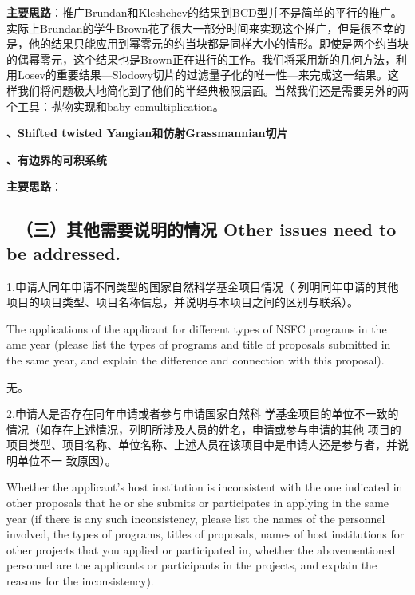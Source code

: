 \documentclass[12pt,UTF8,AutoFakeBold=4,a4paper]{ctexart}
\begin{document}
\textbf{主要思路}：推广Brundan和Kleshchev的结果到BCD型并不是简单的平行的推广。实际上Brundan的学生Brown花了很大一部分时间来实现这个推广，但是很不幸的是，他的结果只能应用到幂零元的约当块都是同样大小的情形。即使是两个约当块的偶幂零元，这个结果也是Brown正在进行的工作。我们将采用新的几何方法，利用Losev的重要结果---Slodowy切片的过滤量子化的唯一性---来完成这一结果。这样我们将问题极大地简化到了他们的半经典极限层面。当然我们还是需要另外的两个工具：抛物实现和baby comultiplication。

\textbf{、Shifted twisted Yangian和仿射Grassmannian切片}

\textbf{、有边界的可积系统}

\textbf{主要思路}：


{\color{MsBlue} \subsection{\sihao \kaishu \quad \ \bfseries（三）其他需要说明的情况 
\xiaosihao {} Other issues need to be addressed.}}
%

{\sihao \color{MsBlue} \kaishu 1.申请人同年申请不同类型的国家自然科学基金项目情况（
列明同年申请的其他项目的项目类型、项目名称信息，并说明与本项目之间的区别与联系）。}

{\color{MsBlue} \xiaosihao {} 
The applications of the applicant for different types of NSFC programs in the 
ame year (please list the types of programs and title of proposals submitted 
in the same year, and explain the difference and connection with this proposal).}

无。

{\sihao \color{MsBlue} \kaishu 2.申请人是否存在同年申请或者参与申请国家自然科
学基金项目的单位不一致的情况（如存在上述情况，列明所涉及人员的姓名，申请或参与申请的其他
项目的项目类型、项目名称、单位名称、上述人员在该项目中是申请人还是参与者，并说明单位不一
致原因）。}

{\color{MsBlue} \xiaosihao {} 
Whether the applicant's host institution is inconsistent with the one indicated 
in other proposals that he or she submits or participates in applying in the 
same year (if there is any such inconsistency, please list the names of the 
personnel involved, the types of programs, titles of proposals, names of host 
institutions for other projects that you applied or participated in, whether 
the abovementioned personnel are the applicants or participants in the projects, 
and explain the reasons for the inconsistency).}
\end{document}
